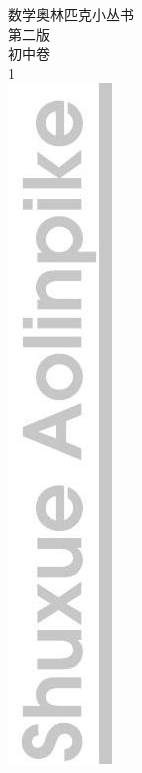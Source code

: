\documentclass[10pt]{article}
\begin{document}
数学奥林匹克小丛书\\
第二版\\
初中卷\\
1\\
\includegraphics[max width=\textwidth, center]{2024_10_30_bd799899fef40368a068g-002(1)}\\
\end{document}
